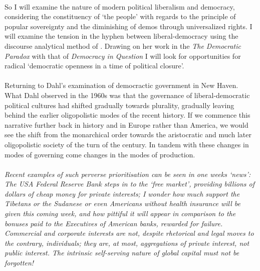 \paragraph{}So I will examine the nature of modern political liberalism and democracy, considering the constituency of `the people' with regards to the principle of popular sovereignty and the diminishing of demos through universalized rights. I will examine the tension in the hyphen between  liberal-democracy using the discourse analytical method of . Drawing on her work in the \emph{The Democratic Paradox} with that of  \emph{Democracy in Question} I will look for opportunities for radical `democratic openness in a time of political closure'.

\paragraph{}Returning to Dahl's examination of democractic government in New Haven. What Dahl observed in the 1960s was that the governance of liberal-democratic political cultures had shifted gradually towards plurality, gradually leaving behind the earlier oligopolistic modes of the recent history. If we commence this narrative further back in history and in Europe rather than America, we would see the shift from the monarchical order towards the aristocratic and much later oligopolistic society of the turn of the century. In tandem with these changes in modes of governing come changes in the modes of production.

\paragraph{}\textit{Recent examples of such perverse prioritisation can be seen in one weeks `news': The USA Federal Reserve Bank steps in to the `free market', providing billions of dollars of cheap money for private interests; I wonder how much support the Tibetans or the Sudanese or even Americans without health insurance will be given this coming week, and how pittiful it will appear in comparison to the bonuses paid to the Executives of American banks, rewarded for failure. Commercial and corporate interests are not, despite rhetorical and legal moves to the contrary, individuals; they are, at most, aggregations of private interest, not public interest. The intrinsic self-serving nature of global capital must not be forgotten!}


